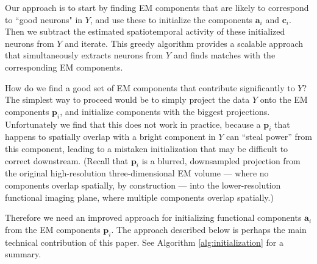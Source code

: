 \documentclass[10pt,letterpaper]{article}
\begin{document}
{Our approach is to start by finding EM components that are likely to correspond to ``good neurons" in $Y$, and use these to initialize the components $\bm{a}_i$ and $\bm{c}_i$.  Then we subtract the estimated spatiotemporal activity of these initialized neurons from $Y$ and iterate. This greedy algorithm provides a scalable approach that simultaneously extracts neurons from $Y$ and finds matches with the corresponding EM components. 

How do we find a good set of EM components that contribute significantly to $Y$?  The simplest way to proceed would be to simply project the data $Y$ onto the EM components $\bm{p}_i$, and initialize components with the biggest projections.  Unfortunately we find that this does not work in practice, because a $\bm{p}_i$ that happens to spatially overlap with a bright component in $Y$ can ``steal power'' from this component, leading to a mistaken initialization that may be difficult to correct downstream.  (Recall that $\bm{p}_i$ is a blurred, downsampled projection from the original high-resolution three-dimensional EM volume --- where no components overlap spatially, by construction --- into the lower-resolution functional imaging plane, where multiple components overlap spatially.)

Therefore we need an improved approach for initializing functional components $\bm{a}_i$ from the EM components $\bm{p}_i$.  The approach described below is perhaps the main technical contribution of this paper.  See Algorithm \ref{alg:initialization} for a summary.

}
\end{document}
